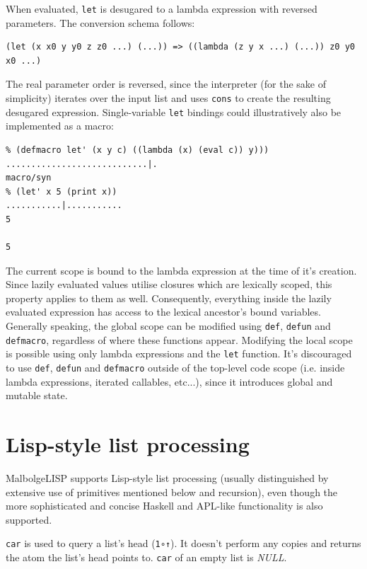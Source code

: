 \par When evaluated, \verb|let| is desugared to a lambda expression with reversed parameters. The conversion schema follows:

\begin{verbatim}
(let (x x0 y y0 z z0 ...) (...)) => ((lambda (z y x ...) (...)) z0 y0 x0 ...)
\end{verbatim}

\par The real parameter order is reversed, since the interpreter (for the sake of simplicity) iterates over the input list and uses \verb|cons| to create the resulting desugared expression. Single-variable \verb|let| bindings could illustratively also be implemented as a macro:

\begin{verbatim}
% (defmacro let' (x y c) ((lambda (x) (eval c)) y)))
............................|.
macro/syn
% (let' x 5 (print x))
...........|...........
5

5
\end{verbatim}

\par The current scope is bound to the lambda expression at the time of it's creation. Since lazily evaluated values utilise closures which are lexically scoped, this property applies to them as well. Consequently, everything inside the lazily evaluated expression has access to the lexical ancestor's bound variables. Generally speaking, the global scope can be modified using \verb|def|, \verb|defun| and \verb|defmacro|, regardless of where these functions appear. Modifying the local scope is possible using only lambda expressions and the \verb|let| function. It's discouraged to use \verb|def|, \verb|defun| and \verb|defmacro| outside of the top-level code scope (i.e. inside lambda expressions, iterated callables, etc...), since it introduces global and mutable state.

\section{Lisp-style list processing}

\par MalbolgeLISP supports Lisp-style list processing (usually distinguished by extensive use of primitives mentioned below and recursion), even though the more sophisticated and concise Haskell and APL-like functionality is also supported.

\par \verb|car| is used to query a list's head (\verb|1∘↑|). It doesn't perform any copies and returns the atom the list's head points to. \verb|car| of an empty list is \textit{NULL}. 

